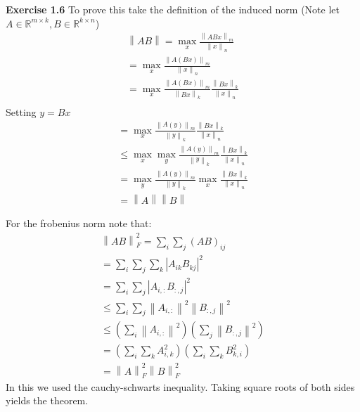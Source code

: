 \documentclass[12pt]{article}
\newenvironment{exercise}[1]{\vspace{.1in}\noindent\textbf{Exercise #1 \hspace{.05em}}}{}
\newcommand{\R}{\mathbb{R}}
\newcommand{\norm}[1]{\left\lVert#1\right\rVert}
\begin{document}
\begin{exercise}{1.6}
	To prove this take the definition of the induced norm (Note let $A\in \R^{m\times k}, B\in \R^{k\times n}$)
	\begin{align}
		\norm{AB} = \max_x \frac{\norm{ABx}_m}{\norm{x}_n}                        \\
		= \max_x \frac{\norm{A(Bx)}_m}{\norm{x}_n}                                \\
		= \max_x \frac{\norm{A(Bx)}_m}{\norm{Bx}_k}\frac{\norm{Bx}_k}{\norm{x}_n} \\
	\end{align}
	Setting $y=Bx$
	\begin{align}
		= \max_x \frac{\norm{A(y)}_m}{\norm{y}_k}\frac{\norm{Bx}_k}{\norm{x}_n}          \\
		\leq \max_x\max_y \frac{\norm{A(y)}_m}{\norm{y}_k}\frac{\norm{Bx}_k}{\norm{x}_n} \\
		= \max_y\frac{\norm{A(y)}_m}{\norm{y}_k}\max_x\frac{\norm{Bx}_k}{\norm{x}_n}     \\
		= \norm{A}\norm{B}
	\end{align}

	For the frobenius norm note that:
	\begin{align}
		\norm{AB}_F^2=\sum_{i}\sum_j (AB)_{ij}                 \\
		=\sum_{i}\sum_j \sum_{k}|A_{ik}B_{kj}|^2               \\
		=\sum_{i}\sum_j  |A_{i,:}B_{:,j}|^2                    \\
		\leq \sum_i\sum_j \norm{A_{i,:}}^2\norm{B_{:,j}}^2     \\
		\leq (\sum_i \norm{A_{i,:}}^2)(\sum_j\norm{B_{:,j}}^2) \\ =(\sum_i \sum_k A_{i,k}^2)(\sum_i \sum_k B_{k,i}^2)    \\
		=\norm{A}_F^2\norm{B}^2_F
	\end{align}
	In this we used the cauchy-schwarts inequality. Taking square roots of both sides yields the theorem.
\end{exercise}
\end{document}

